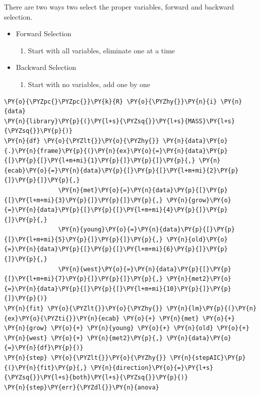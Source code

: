 \documentclass[10pt]{article}\usepackage[]{graphicx}\usepackage[]{xcolor}
\begin{document}
There are two ways two select the proper variables, forward and backward
selection.

\begin{itemize}
\itemsep1pt\parskip0pt
\item
  Forward Selection

  \begin{enumerate}
  \def\labelenumi{\arabic{enumi}.}
  \itemsep1pt\parskip0pt
  \item
    Start with all variables, eliminate one at a time
  \end{enumerate}
\item
  Backward Selection

  \begin{enumerate}
  \def\labelenumi{\arabic{enumi}.}
  \itemsep1pt\parskip0pt
  \item
    Start with no variables, add one by one
  \end{enumerate}
\end{itemize}

    \begin{Verbatim}[commandchars=\\\{\}]
\PY{o}{\PYZpc{}\PYZpc{}}\PY{k}{R} \PY{o}{\PYZhy{}}\PY{n}{i} \PY{n}{data}
\PY{n}{library}\PY{p}{(}\PY{l+s}{\PYZsq{}}\PY{l+s}{MASS}\PY{l+s}{\PYZsq{}}\PY{p}{)}
\PY{n}{df} \PY{o}{\PYZlt{}}\PY{o}{\PYZhy{}} \PY{n}{data}\PY{o}{.}\PY{n}{frame}\PY{p}{(}\PY{n}{ex}\PY{o}{=}\PY{n}{data}\PY{p}{[}\PY{p}{[}\PY{l+m+mi}{1}\PY{p}{]}\PY{p}{]}\PY{p}{,} \PY{n}{ecab}\PY{o}{=}\PY{n}{data}\PY{p}{[}\PY{p}{[}\PY{l+m+mi}{2}\PY{p}{]}\PY{p}{]}\PY{p}{,} 
               \PY{n}{met}\PY{o}{=}\PY{n}{data}\PY{p}{[}\PY{p}{[}\PY{l+m+mi}{3}\PY{p}{]}\PY{p}{]}\PY{p}{,} \PY{n}{grow}\PY{o}{=}\PY{n}{data}\PY{p}{[}\PY{p}{[}\PY{l+m+mi}{4}\PY{p}{]}\PY{p}{]}\PY{p}{,} 
               \PY{n}{young}\PY{o}{=}\PY{n}{data}\PY{p}{[}\PY{p}{[}\PY{l+m+mi}{5}\PY{p}{]}\PY{p}{]}\PY{p}{,} \PY{n}{old}\PY{o}{=}\PY{n}{data}\PY{p}{[}\PY{p}{[}\PY{l+m+mi}{6}\PY{p}{]}\PY{p}{]}\PY{p}{,}
               \PY{n}{west}\PY{o}{=}\PY{n}{data}\PY{p}{[}\PY{p}{[}\PY{l+m+mi}{7}\PY{p}{]}\PY{p}{]}\PY{p}{,} \PY{n}{met2}\PY{o}{=}\PY{n}{data}\PY{p}{[}\PY{p}{[}\PY{l+m+mi}{10}\PY{p}{]}\PY{p}{]}\PY{p}{)}
\PY{n}{fit} \PY{o}{\PYZlt{}}\PY{o}{\PYZhy{}} \PY{n}{lm}\PY{p}{(}\PY{n}{ex}\PY{o}{\PYZti{}}\PY{n}{ecab} \PY{o}{+} \PY{n}{met} \PY{o}{+} \PY{n}{grow} \PY{o}{+} \PY{n}{young} \PY{o}{+} \PY{n}{old} \PY{o}{+} \PY{n}{west} \PY{o}{+} \PY{n}{met2}\PY{p}{,} \PY{n}{data}\PY{o}{=}\PY{n}{df}\PY{p}{)}
\PY{n}{step} \PY{o}{\PYZlt{}}\PY{o}{\PYZhy{}} \PY{n}{stepAIC}\PY{p}{(}\PY{n}{fit}\PY{p}{,} \PY{n}{direction}\PY{o}{=}\PY{l+s}{\PYZsq{}}\PY{l+s}{both}\PY{l+s}{\PYZsq{}}\PY{p}{)}
\PY{n}{step}\PY{err}{\PYZdl{}}\PY{n}{anova}
\end{Verbatim}
\end{document}
